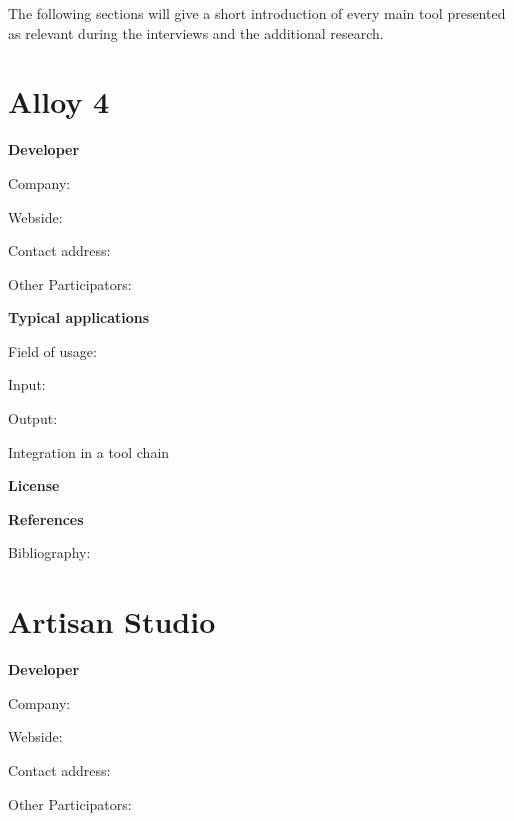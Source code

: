 \documentclass{./template/openetcs_report}
\begin{document}
The following sections will give a short introduction of every main tool presented as relevant during the interviews and the additional research. 

\section{Alloy 4}


	\textbf{Developer}

	Company: 

	Webside:

	Contact address:

	Other  Participators:



	\textbf{Typical applications}

	Field of usage:


	Input:

	Output:





	Integration in a tool chain



	\textbf{License}


	\textbf{References}

	Bibliography:





\section{Artisan Studio}

	\textbf{Developer}

	Company: 

	Webside:

	Contact address:

	Other  Participators:
\end{document}
